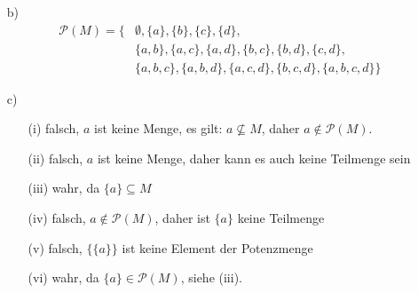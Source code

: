 \documentclass[a4paper]{scrartcl}
\begin{document}
\begin{enumerate}
\begin{enumerate}

            \item[b)]
                $$\begin{array}{rl}
                    \mathcal{P}(M) = \Big\{ & \emptyset, \{a\}, \{b\}, \{c\}, \{d\},\\
                        & \{a,b\}, \{a,c\}, \{a,d\}, \{b,c\}, \{b,d\}, \{c,d\},\\
                        & \{a,b,c\}, \{a,b,d\}, \{a,c,d\}, \{b,c,d\}, \{a,b,c,d\} \Big\}
                \end{array}$$

            \item[c)]
                \begin{enumerate}
                    \item[(i)]
                        falsch, $a$ ist keine Menge, es gilt: $a \not\subseteq M$, daher $a \notin \mathcal{P}(M)$.
                    \item[(ii)]
                        falsch, $a$ ist keine Menge, daher kann es auch keine Teilmenge sein
                    \item[(iii)]
                        wahr, da $\{a\} \subseteq M$
                    \item[(iv)]
                        falsch, $a \notin \mathcal{P}(M)$, daher ist $\{a\}$ keine Teilmenge
                    \item[(v)]
                        falsch, $\{\{a\}\}$ ist keine Element der Potenzmenge
                    \item[(vi)]
                        wahr, da $\{a\} \in \mathcal{P}(M)$, siehe (iii).
                \end{enumerate}


        \end{enumerate}
\end{enumerate}
\end{document}
